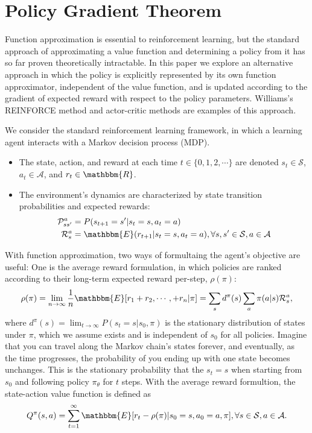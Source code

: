 \section{Policy Gradient Theorem}

Function approximation is essential to reinforcement learning, but the standard approach of approximating a value function and determining a policy from it has so far proven theoretically intractable. In this paper we explore an alternative approach in which the policy is explicitly represented by its own function approximator, independent of the value function, and is updated according to the gradient of expected reward with respect to the policy parameters. Williams's REINFORCE method and actor-critic methods are examples of this approach.


We consider the standard reinforcement learning framework, in which a learning agent interacts with a Markov decision process (MDP). 

\begin{itemize}
	\item The state, action, and reward at each time $t\in \{0, 1, 2, \cdots\}$ are denoted $s_t\in \mathcal{S}$, $a_t\in \mathcal{A}$, and $r_t\in \mathbbm{R}$.
	\item The environment's dynamics are characterized by state transition probabilities and expected rewards:
		\begin{align*}
			\mathcal{P}_{ss'}^a &= P(s_{t+1}=s'|s_t=s,a_t=a)\\
			\mathcal{R}_{s}^a &= \mathbbm{E}(r_{t+1}|s_t=s,a_t=a), \forall s, s' \in \mathcal{S}, a\in \mathcal{A}
		\end{align*}
\end{itemize}

With function approximation, two ways of formultaing the agent's objective are useful: One is the average reward formulation, in which policies are ranked according to their long-term expected reward per-step, $\rho(\pi)$:
$$\rho(\pi) = \lim_{n\to\infty} \frac{1}{n}\mathbbm{E}[r_1 + r_2,\cdots,+r_n|\pi] = \sum_s d^\pi(s)\sum_a \pi(a|s)\mathcal{R}_s^a,$$
where $d^\pi(s) = \lim_{t\to \infty}P(s_t=s|s_0,\pi)$ is the stationary distribution of states under $\pi$, which we assume exists and is independent of $s_0$ for all policies. Imagine that you can travel along the Markov chain's states forever, and eventually, as the time progresses, the probability of you ending up with one state becomes unchanges. This is the stationary probability that the $s_t=s$ when starting from $s_0$ and following policy $\pi_\theta$ for $t$ steps. With the average reward formultion, the state-action value function is defined as 
$$Q^\pi(s,a) = \sum_{t=1}^{\infty}\mathbbm{E}[r_t-\rho(\pi)|s_0=s, a_0=a, \pi], \forall s\in \mathcal{S}, a\in \mathcal{A}.$$


